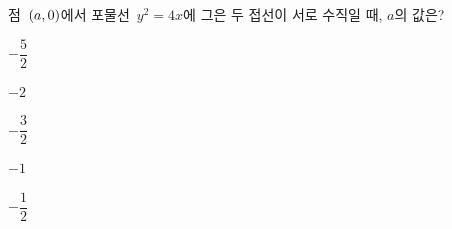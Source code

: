 점~$(a{,}\mkern3mu\mathopen{}0)$에서 포물선~$y^2=4x$에 그은 두 접선이 서로 수직일 때, $a$의 값은?
\begin{choices32}{\rule[-3ex]{0pt}{8ex}$-\dfrac{5}{2}$}{\rule[-3ex]{0pt}{8ex}$-2$}{\rule[-3ex]{0pt}{8ex}$-\dfrac{3}{2}$}{\rule[-3ex]{0pt}{8ex}$-1$}{\rule[-3ex]{0pt}{8ex}$-\dfrac{1}{2}$}\end{choices32}
